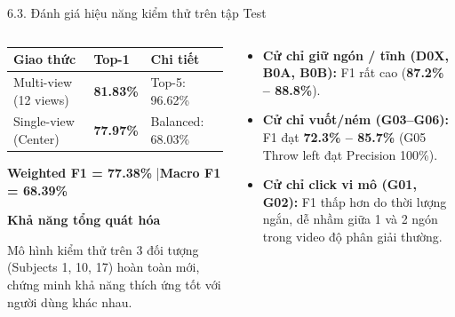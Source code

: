 \documentclass[aspectratio=169,9pt]{beamer}
\newcommand{\smallnote}[1]{{\fontsize{7.1}{8.4}\selectfont #1\par}}
\newcommand{\heading}[1]{{\bfseries\color{PTITRed} #1\par}}
\newcommand{\tightitems}{\setlength{\itemsep}{0.13em}\setlength{\parskip}{0pt}\setlength{\parsep}{0pt}}
\begin{document}
\begin{frame}{6.3. Đánh giá hiệu năng kiểm thử trên tập Test}
  \vspace{0.08cm}
  \begin{columns}[T,onlytextwidth]
    \begin{column}{0.48\textwidth}
      \begin{tcolorbox}[titlepanel,title=Hiệu năng tổng thể Test Set (622 mẫu),equal height group=s6_3_top]
        {\fontsize{7.4}{8.6}\selectfont
        \renewcommand{\arraystretch}{1.20}
        \begin{tabularx}{\linewidth}{@{}L{2.85cm}C{1.35cm}Y@{}}
          \toprule
          \textbf{Giao thức} & \textbf{Top-1} & \textbf{Chi tiết}\\
          \midrule
          Multi-view (12 views) & \textbf{81.83\%} & Top-5: 96.62\%\\
          Single-view (Center) & \textbf{77.97\%} & Balanced: 68.03\%\\
          \bottomrule
        \end{tabularx}}
        \vspace{0.06cm}
        \smallnote{\textbf{Weighted F1 = 77.38\%} \quad|\quad \textbf{Macro F1 = 68.39\%}}
      \end{tcolorbox}
      \vspace{0.14cm}
      \begin{tcolorbox}[panel,equal height group=s6_3_bot]
        \heading{Khả năng tổng quát hóa}
        \smallnote{Mô hình kiểm thử trên 3 đối tượng (Subjects 1, 10, 17) hoàn toàn mới, chứng minh khả năng thích ứng tốt với người dùng khác nhau.}
      \end{tcolorbox}
    \end{column}
    \begin{column}{0.48\textwidth}
      \begin{tcolorbox}[titlepanel,title=Phân tích theo nhóm cử chỉ tay,equal height group=s6_3_top]
        {\fontsize{7.3}{8.5}\selectfont
        \begin{itemize}\tightitems
          \item \textbf{Cử chỉ giữ ngón / tĩnh (D0X, B0A, B0B):} F1 rất cao (\textbf{87.2\% -- 88.8\%}).
          \item \textbf{Cử chỉ vuốt/ném (G03--G06):} F1 đạt \textbf{72.3\% -- 85.7\%} (G05 Throw left đạt Precision 100\%).
          \item \textbf{Cử chỉ click vi mô (G01, G02):} F1 thấp hơn do thời lượng ngắn, dễ nhầm giữa 1 và 2 ngón trong video độ phân giải thường.

\end{itemize}}
\end{tcolorbox}
\end{column}
\end{columns}
\end{frame}
\end{document}
